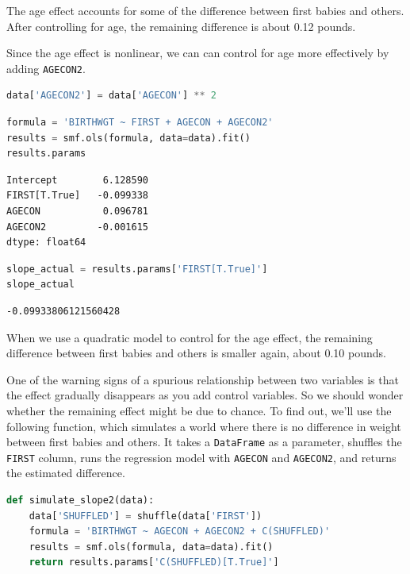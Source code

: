 The age effect accounts for some of the difference between first babies
and others. After controlling for age, the remaining difference is about
0.12 pounds.

Since the age effect is nonlinear, we can can control for age more
effectively by adding \passthrough{\lstinline!AGECON2!}.

\begin{lstlisting}[language=Python,style=source]
data['AGECON2'] = data['AGECON'] ** 2
\end{lstlisting}

\begin{lstlisting}[language=Python,style=source]
formula = 'BIRTHWGT ~ FIRST + AGECON + AGECON2'
results = smf.ols(formula, data=data).fit()
results.params
\end{lstlisting}

\begin{lstlisting}[style=output]
Intercept        6.128590
FIRST[T.True]   -0.099338
AGECON           0.096781
AGECON2         -0.001615
dtype: float64
\end{lstlisting}

\begin{lstlisting}[language=Python,style=source]
slope_actual = results.params['FIRST[T.True]']
slope_actual
\end{lstlisting}

\begin{lstlisting}[style=output]
-0.09933806121560428
\end{lstlisting}

When we use a quadratic model to control for the age effect, the
remaining difference between first babies and others is smaller again,
about 0.10 pounds.

One of the warning signs of a spurious relationship between two
variables is that the effect gradually disappears as you add control
variables. So we should wonder whether the remaining effect might be due
to chance. To find out, we'll use the following function, which
simulates a world where there is no difference in weight between first
babies and others. It takes a \passthrough{\lstinline!DataFrame!} as a
parameter, shuffles the \passthrough{\lstinline!FIRST!} column, runs the
regression model with \passthrough{\lstinline!AGECON!} and
\passthrough{\lstinline!AGECON2!}, and returns the estimated difference.

\begin{lstlisting}[language=Python,style=source]
def simulate_slope2(data):
    data['SHUFFLED'] = shuffle(data['FIRST'])
    formula = 'BIRTHWGT ~ AGECON + AGECON2 + C(SHUFFLED)'
    results = smf.ols(formula, data=data).fit()
    return results.params['C(SHUFFLED)[T.True]']
\end{lstlisting}

